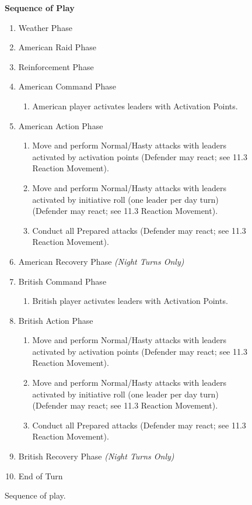 \documentclass[11pt]{article}
\newenvironment{playchart}[1][0.78\linewidth]{%
  \begin{figure}[htbp]
    \centering
    \begin{minipage}{#1}
      \centering\small
      \renewcommand{\arraystretch}{1.16}
      \setlength{\tabcolsep}{6pt}
}{%
    \end{minipage}
  \end{figure}%
}
\newcommand{\charttitle}[1]{\textbf{\large #1}\par\smallskip}
\newcommand{\chartcaption}[1]{\par\medskip\caption{#1}}
\begin{document}
\begin{playchart}[0.76\linewidth]
  \charttitle{Sequence of Play}
  \raggedright
  \begin{enumerate}[label=\arabic*., leftmargin=1.9em, itemsep=0.2em, topsep=0.1em]
    \item Weather Phase
    \item American Raid Phase
    \item Reinforcement Phase
    \item American Command Phase
      \begin{enumerate}[label=\alph*., leftmargin=1.8em, itemsep=0pt, topsep=0pt]
        \item American player activates leaders with Activation Points.
      \end{enumerate}
    \item American Action Phase
      \begin{enumerate}[label=\alph*., leftmargin=1.8em, itemsep=0pt, topsep=0pt]
        \item Move and perform Normal/Hasty attacks with leaders activated by activation points (Defender may react; see 11.3 Reaction Movement).
        \item Move and perform Normal/Hasty attacks with leaders activated by initiative roll (one leader per day turn) (Defender may react; see 11.3 Reaction Movement).
        \item Conduct all Prepared attacks (Defender may react; see 11.3 Reaction Movement).
      \end{enumerate}
    \item American Recovery Phase \textit{(Night Turns Only)}
    \item British Command Phase
      \begin{enumerate}[label=\alph*., leftmargin=1.8em, itemsep=0pt, topsep=0pt]
        \item British player activates leaders with Activation Points.
      \end{enumerate}
    \item British Action Phase
      \begin{enumerate}[label=\alph*., leftmargin=1.8em, itemsep=0pt, topsep=0pt]
        \item Move and perform Normal/Hasty attacks with leaders activated by activation points (Defender may react; see 11.3 Reaction Movement).
        \item Move and perform Normal/Hasty attacks with leaders activated by initiative roll (one leader per day turn) (Defender may react; see 11.3 Reaction Movement).
        \item Conduct all Prepared attacks (Defender may react; see 11.3 Reaction Movement).
      \end{enumerate}
    \item British Recovery Phase \textit{(Night Turns Only)}
    \item End of Turn
  \end{enumerate}
  \chartcaption{Sequence of play.}
\end{playchart}
\end{document}
